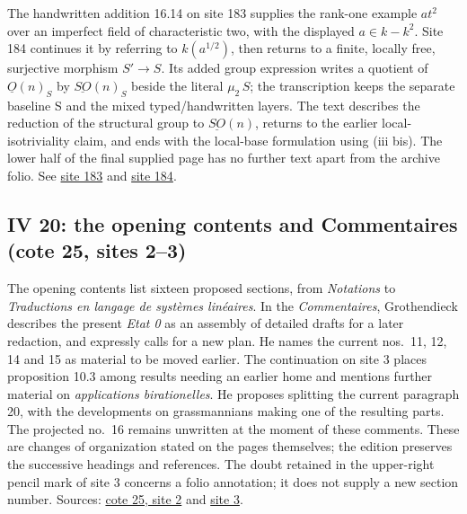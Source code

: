 \documentclass[10pt,a4paper]{article}
\begin{document}
The handwritten addition 16.14 on site 183 supplies the rank-one example \(at^2\) over an imperfect field of characteristic two, with the displayed \(a\in k-k^2\). Site 184 continues it by referring to \(k(a^{1/2})\), then returns to a finite, locally free, surjective morphism \(S'\longrightarrow S\). Its added group expression writes a quotient of \(\underline O(n)_S\) by \(\underline{SO}(n)_S\) beside the literal \(\mu_2\,S\); the transcription keeps the separate baseline S and the mixed typed/handwritten layers. The text describes the reduction of the structural group to \(\underline{SO}(n)\), returns to the earlier local-isotriviality claim, and ends with the local-base formulation using (iii bis). The lower half of the final supplied page has no further text apart from the archive folio. See \href{https://grothendieck.umontpellier.fr/web/viewer.html?file=../25.pdf#page=184}{site 183} and \href{https://grothendieck.umontpellier.fr/web/viewer.html?file=../25.pdf#page=185}{site 184}.
\par{}

\par{}
\subsection*{IV 20: the opening contents and Commentaires (cote 25, sites 2--3)}
The opening contents list sixteen proposed sections, from \emph{Notations} to \emph{Traductions en langage de systèmes linéaires}. In the \emph{Commentaires}, Grothendieck describes the present \emph{Etat 0} as an assembly of detailed drafts for a later redaction, and expressly calls for a new plan. He names the current nos.\ 11, 12, 14 and 15 as material to be moved earlier. The continuation on site 3 places proposition 10.3 among results needing an earlier home and mentions further material on \emph{applications birationelles}. He proposes splitting the current paragraph 20, with the developments on grassmannians making one of the resulting parts. The projected no.\ 16 remains unwritten at the moment of these comments. These are changes of organization stated on the pages themselves; the edition preserves the successive headings and references. The doubt retained in the upper-right pencil mark of site 3 concerns a folio annotation; it does not supply a new section number. Sources: \href{https://grothendieck.umontpellier.fr/web/viewer.html?file=../25.pdf\#page=3}{cote 25, site 2} and \href{https://grothendieck.umontpellier.fr/web/viewer.html?file=../25.pdf\#page=4}{site 3}.
\par{}
\end{document}

